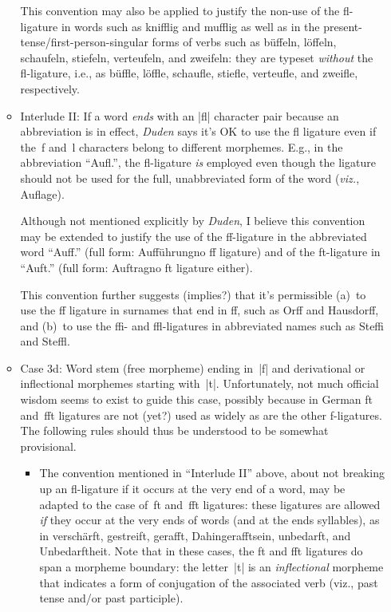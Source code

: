 \documentclass[11pt]{article}
\begin{document}
\begin{itemize}
\begin{itemize}
This convention may also be applied to justify the non-use of the fl-ligature in words such as knifflig and mufflig as well as in the present-tense/first-person-singular forms of verbs such as büffeln, löffeln, schaufeln, stiefeln, verteufeln, and zweifeln: they are typeset \emph{without} the fl-ligature, i.e., as büffle, löffle, schaufle, stiefle, verteufle, and zweifle, respectively.

\item Interlude II: If a word \emph{ends} with an |fl| character pair because an abbreviation is in effect, \emph{Duden} says it's OK to use the fl ligature even if the~f and~l characters belong to different morphemes. E.g., in the abbreviation \enquote{Aufl.}, the fl-ligature \emph{is} employed even though the ligature should not be used for the full, unabbreviated form of the word (\emph{viz.}, Auflage).

Although not mentioned explicitly by \emph{Duden}, I believe this convention may be extended to justify the use of the ff-ligature in the abbreviated word \enquote{Auff.} (full form: Aufführung\textemdash no ff ligature) and of the ft-ligature in \enquote{Auft.} (full form: Auftrag\textemdash no ft ligature either).

This convention further suggests (implies?) that it's permissible (a)~to use the ff ligature in surnames that end in ff, such as Orff and Hausdorff, and (b)~to use the ffi- and ffl-ligatures in abbreviated names such as Steffi and Steffl. 

\item Case 3d: Word stem (free morpheme) ending in~|f| and derivational or inflectional morphemes starting with~|t|. Unfortunately, not much official wisdom seems to exist to guide this case, possibly because in German ft and~fft ligatures are not (yet?) used as widely as are the other f-ligatures. The following rules should thus be understood to be somewhat provisional.

\begin{itemize}
\item The convention mentioned in \enquote{Interlude II} above, about not breaking up an fl-ligature if it occurs at the very end of a word, may be adapted to the case of~ft and~fft ligatures: these ligatures are allowed \emph{if} they occur at the very ends of words (and at the ends syllables), as in verschärft, gestreift, gerafft, Dahingerafftsein, unbedarft, and Unbedarftheit. Note that in these cases, the ft and fft ligatures do span a morpheme boundary: the letter~|t| is an \emph{inflectional} morpheme that indicates a form of conjugation of the associated verb (viz., past tense and/or past participle).


\end{itemize}
\end{itemize}
\end{itemize}
\end{document}
